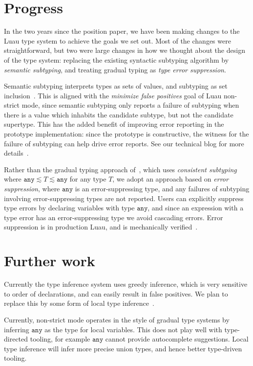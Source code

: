 \documentclass[acmsmall]{acmart}
\newcommand{\ANY}{\mathtt{any}}
\begin{document}
\section{Progress}

In the two years since the position paper, we have been making changes
to the Luau type system to achieve the goals we set out. Most of the
changes were straightforward, but two were large changes in how we
thought about the design of the type system: replacing the existing
syntactic subtyping algorithm by \emph{semantic subtyping}, and
treating gradual typing as \emph{type error suppression}.

Semantic subtyping
interprets types as sets of values, and subtyping as set
inclusion~\cite{GF05:GentleIntroduction}. This is aligned with the
\emph{minimize false positives} goal of Luau non-strict mode, since
semantic subtyping only reports a failure of subtyping when there is a
value which inhabits the candidate subtype, but not the candidate
supertype. This has the added benefit of improving error reporting in
the prototype implementation: since the prototype is constructive, the
witness for the failure of subtyping can help drive error reports.
See our technical blog for more details~\cite{Jef22:SemanticSubtyping}.

Rather than the gradual typing approach
of~\cite{ST07:GradualTyping}, which uses \emph{consistent
subtyping} where $\ANY \lesssim T \lesssim \ANY$ for any type $T$, we
adopt an approach based on \emph{error suppression}, where $\ANY$ is
an error-suppressing type, and any failures of subtyping involving
error-suppressing types are not reported. Users can explicitly
suppress type errors by declaring variables with type $\ANY$, and
since an expression with a type error has an error-suppressing type we
avoid cascading errors. Error suppression is in production Luau, and is
mechanically verified~\cite{BJ23:agda-typeck}.

\section{Further work}

Currently the type inference system uses greedy inference, which is
very sensitive to order of declarations, and can easily result in
false positives. We plan to replace this by some form of local type
inference~\cite{PT00:LocalTypeInference}.

Currently, non-strict mode operates in the style of gradual type
systems by inferring $\ANY$ as the type for local variables. This does
not play well with type-directed tooling, for example $\ANY$ cannot
provide autocomplete suggestions. Local type inference will infer more
precise union types, and hence better type-driven tooling.

 
\end{document}
